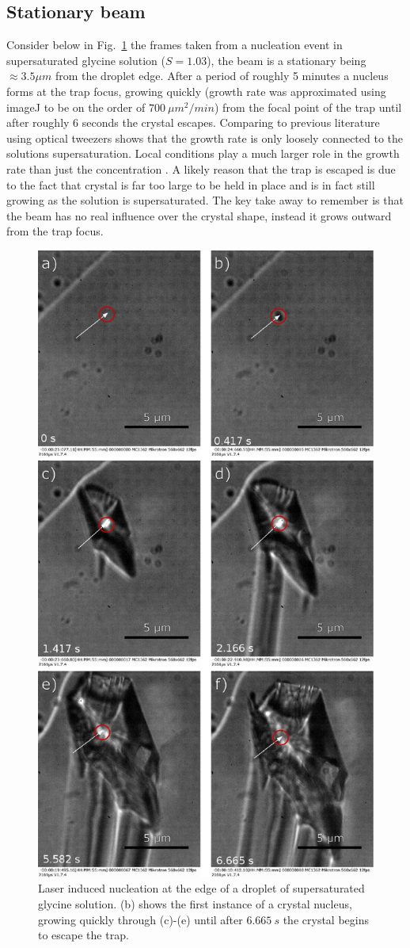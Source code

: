 \subsection{Stationary beam}
\label{sec:stationary}
Consider below in Fig.~\ref{fig:stationary_beam} the frames taken from a nucleation 
event in supersaturated glycine solution ($S=1.03$), the beam is a stationary being 
$\approx3.5 \mu m$ from the droplet edge. After a period of roughly 5 minutes a 
nucleus forms at the trap focus, growing quickly (growth rate was approximated using
imageJ to be on the order of $700\ \mu m^2/min$) from the focal point of the trap 
until after roughly $6$ seconds the crystal escapes. Comparing to previous literature
using optical tweezers shows that the growth rate is only loosely connected to the 
solutions supersaturation. Local conditions play a much larger role in the growth 
rate than just the concentration \cite{Flannigan2023}. A likely reason that the trap 
is escaped is due to the fact that crystal is far too large to be held in place and 
is in fact still growing as the solution is supersaturated. The key take away to 
remember is that the beam has no real influence over the crystal shape, instead 
it grows outward from the trap focus.
\begin{figure}[h!]
	\centering
	\includegraphics[width=0.63\linewidth]{frames_no_beam_movement.pdf}
	\caption{Laser induced nucleation at the edge of a droplet of supersaturated 
	glycine solution. (b) shows the first instance of a crystal nucleus, growing 
	quickly through (c)-(e) until after $6.665\ s$ the crystal begins to escape the trap.}
	\label{fig:stationary_beam}
\end{figure}

